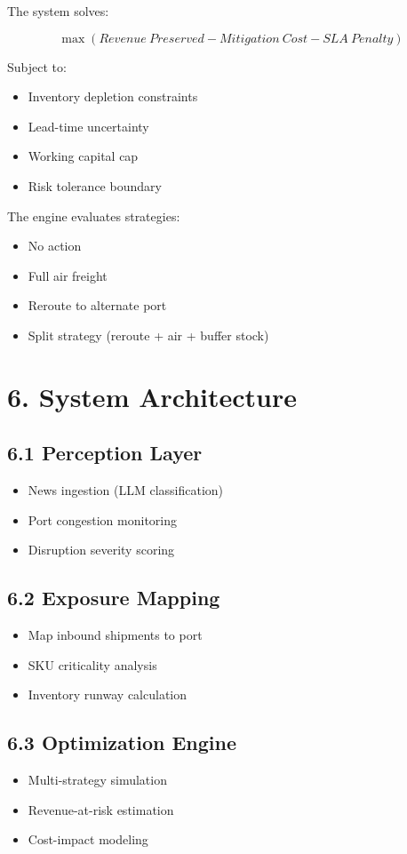 \documentclass[11pt]{article}
\begin{document}
The system solves:

\[
\max (Revenue\ Preserved - Mitigation\ Cost - SLA\ Penalty)
\]

Subject to:

\begin{itemize}
    \item Inventory depletion constraints
    \item Lead-time uncertainty
    \item Working capital cap
    \item Risk tolerance boundary
\end{itemize}

The engine evaluates strategies:

\begin{itemize}
    \item No action
    \item Full air freight
    \item Reroute to alternate port
    \item Split strategy (reroute + air + buffer stock)
\end{itemize}

\section*{6. System Architecture}

\subsection*{6.1 Perception Layer}
\begin{itemize}
    \item News ingestion (LLM classification)
    \item Port congestion monitoring
    \item Disruption severity scoring
\end{itemize}

\subsection*{6.2 Exposure Mapping}
\begin{itemize}
    \item Map inbound shipments to port
    \item SKU criticality analysis
    \item Inventory runway calculation
\end{itemize}

\subsection*{6.3 Optimization Engine}
\begin{itemize}
    \item Multi-strategy simulation
    \item Revenue-at-risk estimation
    \item Cost-impact modeling
\end{itemize}
\end{document}
